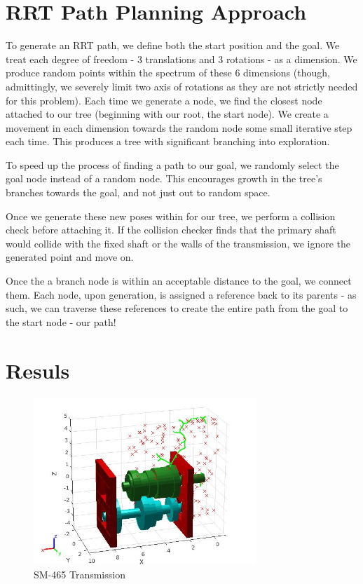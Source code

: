 \documentclass{article}
\begin{document}
\section*{RRT Path Planning Approach}

To generate an RRT path, we define both the start position and the goal. We treat each degree of freedom - 3 translations and 3 rotations - as a dimension. We produce random points within the spectrum of these 6 dimensions (though, admittingly, we severely limit two axis of rotations as they are not strictly needed for this problem). Each time we generate a node, we find the closest node attached to our tree (beginning with our root, the start node). We create a movement in each dimension towards the random node some small iterative step each time. This produces a tree with significant branching into exploration.

To speed up the process of finding a path to our goal, we randomly select the goal node instead of a random node. This encourages growth in the tree's branches towards the goal, and not just out to random space.

Once we generate these new poses within for our tree, we perform a collision check before attaching it. If the collision checker finds that the primary shaft would collide with the fixed shaft or the walls of the transmission, we ignore the generated point and move on.

Once the a branch node is within an acceptable distance to the goal, we connect them. Each node, upon generation, is assigned a reference back to its parents - as such, we can traverse these references to create the entire path from the goal to the start node - our path!

\section*{Resuls}

\begin{figure}[H]
    \centering
    \includegraphics[width = 0.75\textwidth]{img/plan.jpg}
    \caption{SM-465 Transmission}
    \label{fig:path}
\end{figure}
\end{document}
